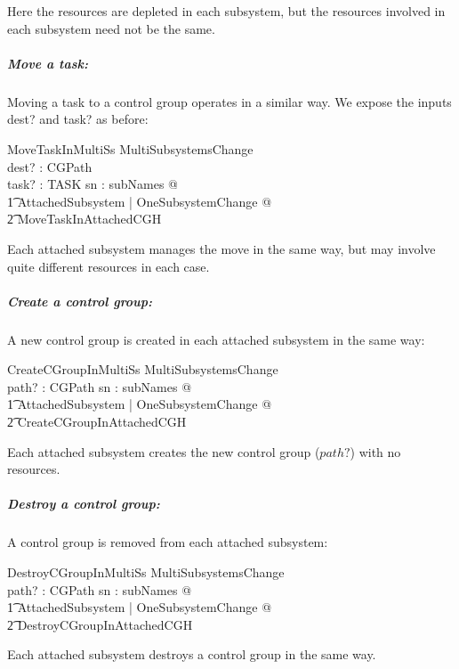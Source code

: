 \documentclass[a4paper,twoside,12pt]{article}
\begin{document}
Here the resources are depleted in each subsystem, but the resources involved in each subsystem need not be the same.

\subparagraph{Move a task:}

Moving a task to a control group operates in a similar way.  We expose the inputs dest? and task? as before:
\begin{schema}{MoveTaskInMultiSs}
MultiSubsystemsChange \\
dest? : CGPath \\
task? : TASK
\where
\forall sn : subNames @ \\
\t1 \exists \Delta AttachedSubsystem | OneSubsystemChange @ \\
    \t2 MoveTaskInAttachedCGH
\end{schema}
Each attached subsystem manages the move in the same way, but may involve quite different resources in each case.

\subparagraph{Create a control group:}

A new control group is created in each attached subsystem in the same way:

\begin{schema}{CreateCGroupInMultiSs}
MultiSubsystemsChange \\
path? : CGPath
\where
\forall sn : subNames @ \\
\t1 \exists \Delta AttachedSubsystem | OneSubsystemChange @ \\
    \t2 CreateCGroupInAttachedCGH
\end{schema}
Each attached subsystem creates the new control group ($path?$) with no resources.

\subparagraph{Destroy a control group:}

A control group is removed from each attached subsystem:

\begin{schema}{DestroyCGroupInMultiSs}
MultiSubsystemsChange \\
path? : CGPath
\where
\forall sn : subNames @ \\
\t1 \exists \Delta AttachedSubsystem | OneSubsystemChange @ \\
    \t2 DestroyCGroupInAttachedCGH
\end{schema}
Each attached subsystem destroys a control group in the same way.
\end{document}
